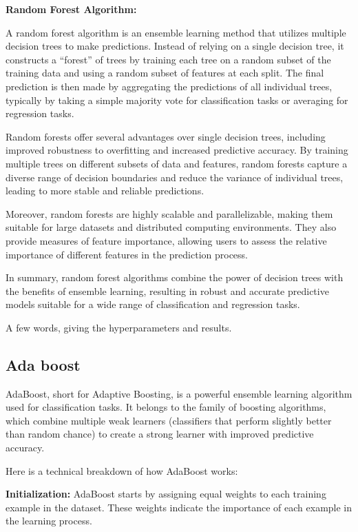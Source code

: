 \documentclass[preprint,aps,nofootinbib,a4paper,superscriptaddress,longbibliography,amsfonts,amssymb,amsmath,titlepage]{revtex4-2}
\begin{document}
\textbf{Random Forest Algorithm:}

A random forest algorithm is an ensemble learning method that utilizes multiple decision trees to make predictions. Instead of relying on a single decision tree, it constructs a ``forest'' of trees by training each tree on a random subset of the training data and using a random subset of features at each split. The final prediction is then made by aggregating the predictions of all individual trees, typically by taking a simple majority vote for classification tasks or averaging for regression tasks.

Random forests offer several advantages over single decision trees, including improved robustness to overfitting and increased predictive accuracy. By training multiple trees on different subsets of data and features, random forests capture a diverse range of decision boundaries and reduce the variance of individual trees, leading to more stable and reliable predictions.

Moreover, random forests are highly scalable and parallelizable, making them suitable for large datasets and distributed computing environments. They also provide measures of feature importance, allowing users to assess the relative importance of different features in the prediction process.

In summary, random forest algorithms combine the power of decision trees with the benefits of ensemble learning, resulting in robust and accurate predictive models suitable for a wide range of classification and regression tasks.

A few words, giving the hyperparameters and results.


\subsection{Ada boost}

AdaBoost, short for Adaptive Boosting, is a powerful ensemble learning algorithm used for classification tasks. It belongs to the family of boosting algorithms, which combine multiple weak learners (classifiers that perform slightly better than random chance) to create a strong learner with improved predictive accuracy.

Here is a technical breakdown of how AdaBoost works:

\textbf{Initialization:} AdaBoost starts by assigning equal weights to each training example in the dataset. These weights indicate the importance of each example in the learning process.
\end{document}
